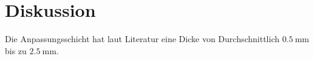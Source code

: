 \section{Diskussion}
\label{sec:Diskussion}
Die Anpassungsschicht hat laut Literatur eine Dicke von Durchschnittlich $\SI{0.5}{\milli\metre}$ bis zu $\SI{2.5}{\milli\metre}$.\cite{anpassungsschicht}
